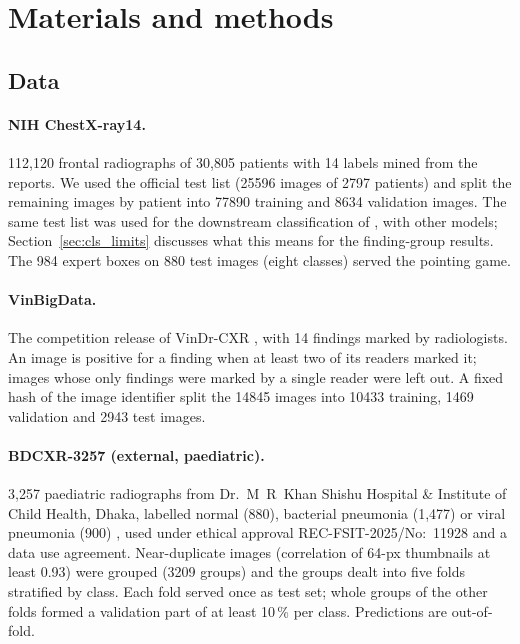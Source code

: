 \section{Materials and methods}
\label{sec:cls_methods}

\subsection{Data}
\label{sec:cls_data}
\paragraph{NIH ChestX-ray14.} \citep{wang2017chestxray} 112,120 frontal radiographs of 30,805 patients with 14 labels mined from the
reports. We used the official test list (\num{25596} images of \num{2797} patients) and split the remaining images by patient into
\num{77890} training and \num{8634} validation images. The same test list was used for the downstream classification of
, with other models; Section~\ref{sec:cls_limits} discusses what this means for the finding-group results. The 984 expert boxes on 880
test images (eight classes) served the pointing game.

\paragraph{VinBigData.} The competition release of VinDr-CXR \citep{vinbigdata2020kaggle,nguyen2022vindrcxr}, with 14 findings marked by
radiologists. An image is positive for a finding when at least two of its readers marked it; images whose only findings were marked by a
single reader were left out. A fixed hash of the image identifier split the \num{14845} images into \num{10433} training, \num{1469}
validation and \num{2943} test images.

\paragraph{BDCXR-3257 (external, paediatric).} 3,257 paediatric radiographs from Dr.~M~R~Khan Shishu Hospital \& Institute of Child Health,
Dhaka, labelled normal (880), bacterial pneumonia (1,477) or viral pneumonia (900) \citep{durjoy2026bdcxr}, used under ethical approval
REC-FSIT-2025/No:~11928 and a data use agreement. Near-duplicate images (correlation of 64-px thumbnails at least 0.93) were grouped
(\num{3209} groups) and the groups dealt into five folds stratified by class. Each fold served once as test set; whole groups of the other
folds formed a validation part of at least 10\,\% per class. Predictions are out-of-fold.

